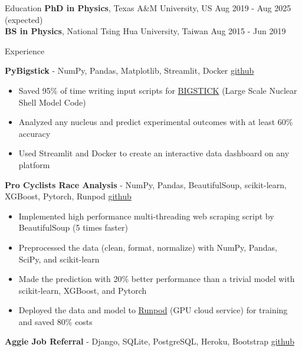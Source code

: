 \documentclass{resume}
\begin{document}
\vspace{-2.75em}
\begin{rSection}{Education}
{\bf PhD in Physics}, Texas A\&M University, US \hfill {Aug 2019 - Aug 2025 (expected)} \\
{\bf BS in Physics}, National Tsing Hua University, Taiwan \hfill {Aug 2015 - Jun 2019}
\vspace{-0.5em}


\begin{rSection}{Experience}
    \vspace{-1.25em}
    \item \textbf{PyBigstick} - {NumPy, Pandas, Matplotlib, Streamlit, Docker} \hfill {\href{https://github.com/noctildon/pyBigstick}{github}}
        \begin{itemize}
        \itemsep -3pt {}
        \item Saved 95\% of time writing input scripts for \href{https://github.com/cwjsdsu/BigstickPublick}{BIGSTICK} (Large Scale Nuclear Shell Model Code)
        \item Analyzed any nucleus and predict experimental outcomes with at least 60\% accuracy
        \item Used Streamlit and Docker to create an interactive data dashboard on any platform
        \end{itemize}
    \item \textbf{Pro Cyclists Race Analysis} - {NumPy, Pandas, BeautifulSoup, scikit-learn, XGBoost, Pytorch, Runpod} \hfill {\href{https://github.com/noctildon/pro_cyclists}{github}}
        \begin{itemize}
        \itemsep -3pt {}
        \item Implemented high performance multi-threading web scraping script by BeautifulSoup (5 times faster)
        \item Preprocessed the data (clean, format, normalize) with NumPy, Pandas, SciPy, and scikit-learn
        \item Made the prediction with 20\% better performance than a trivial model with scikit-learn, XGBoost, and Pytorch
        \item Deployed the data and model to \href{https://www.runpod.io/}{Runpod} (GPU cloud service) for training and saved 80\% costs
        \end{itemize}
    \item \textbf{Aggie Job Referral} - {Django, SQLite, PostgreSQL, Heroku, Bootstrap} \hfill {\href{https://github.com/noctildon/aggie-job-referral}{github}}
        \begin{itemize}

\end{itemize}
\end{rSection}
\end{rSection}
\end{document}
